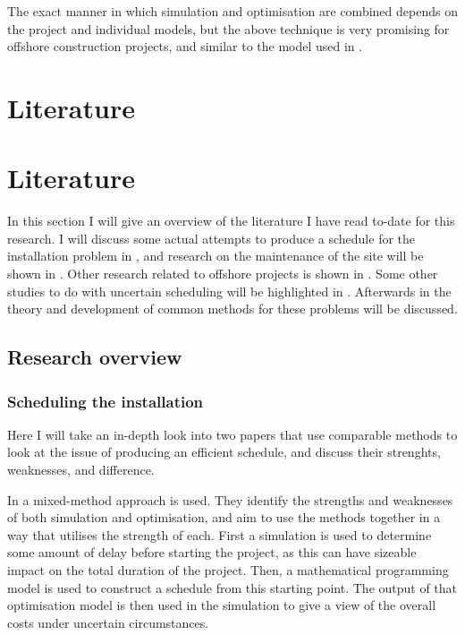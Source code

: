 \documentclass[a4paper,12pt]{article}
\begin{document}
The exact manner in which simulation and optimisation are combined depends on the project and individual models, but the above technique is very promising for offshore construction projects, and similar to the model used in \cite{kerkhove2017optimised}. 

\pagebreak

\section{Literature} \label{s:lit}

\iffalse

\section{Literature} \label{s:lit}
In this section I will give an overview of the literature I have read to-date for this research. I will discuss some actual attempts to produce a schedule for the installation problem in , and research on the maintenance of the site will be shown in . Other research related to offshore projects is shown in . Some other studies to do with uncertain scheduling will be highlighted in .  Afterwards in  the theory and development of common methods for these problems will be discussed.

\subsection{Research overview} \label{ss:rese}

\subsubsection{Scheduling the installation} \label{sss:sched}
Here I will take an in-depth look into two papers that use comparable methods to look at the issue of producing an efficient schedule, and discuss their strenghts, weaknesses, and difference.

\bigskip

In \cite{barlow2018mixed} a mixed-method approach is used. They identify the strengths and weaknesses of both simulation and optimisation, and aim to use the methods together in a way that utilises the strength of each. First a simulation is used to determine some amount of delay before starting the project, as this can have sizeable impact on the total duration of the project. Then, a mathematical programming model is used to construct a schedule from this starting point. The output of that optimisation model is then used in the simulation to give a view of the overall costs under uncertain circumstances. 
\end{document}
